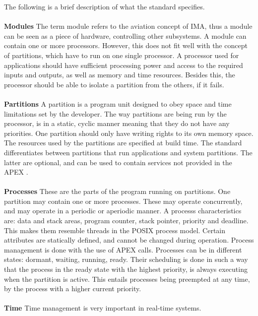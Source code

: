 The following is a brief description of what the standard specifies.
\\\\
\textbf{Modules}
The term module refers to the aviation concept of IMA, thus a module
can be seen as a piece of hardware, controlling other subsystems.
A module can contain one or more processors. However, this does not fit 
well with the concept of partitions,
which have to run on one single processor. \cite{arinc_page_11}
A processor used for \arinc{} applications should have sufficient processing
power and access to the required inputs and outputs,
as well as memory and time resources.
Besides this, the processor should be able to isolate a partition from
the others, if it fails.
\cite{arinc_page_12}
\\\\
\textbf{Partitions}
A partition is a program unit designed to obey space and time limitations
set by the developer. The way partitions are being run by the processor,
is in a static, cyclic manner meaning that they do not have any priorities.
One partition should only have writing rights to its own memory space.
\cite{arinc_page_13}
The resources used by the partitions are specified at build time.
\cite{arinc_page_14}
The standard differentiates between partitions that run applications and system partitions. The latter are optional, and can be used to contain
services not provided in the APEX \cite{arinc_scarlett}.
\\\\
\textbf{Processes}
These are the parts of the program running on partitions. One partition
may contain one or more processes. These may operate concurrently,
and may operate in a periodic or aperiodic manner.
A process\textquotesingle s
characteristics are: data and stack areas, program counter, stack pointer,
priority and deadline. This makes them resemble threads in the POSIX\cite{} process model.
Certain attributes are statically defined, and cannot
be changed during operation.
\cite{arinc_page_19}
Process management is done with the use of APEX calls.
Processes can be in different states: dormant, waiting, running, ready.
Their scheduling is done in such a way that the process in the ready state
with the highest priority, is always executing when the partition is active.
This entails processes being preempted at any time, by the process with a
higher current priority.
\cite{arinc_page_20}
\\\\
\textbf{Time}
Time management is very important in real-time systems.
